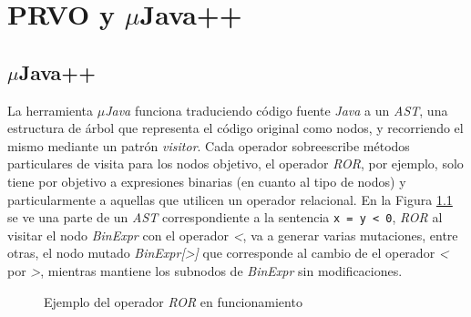 \chapter[Implementaci\'on]{PRVO y $\mu$Java++}
\label{cap:implementation}

\section{$\mu$Java++}

La herramienta \emph{$\mu$Java} \cite{bibliography.mutation.tools.muJavaMaOK05} funciona traduciendo c\'odigo fuente \emph{Java} a un \emph{AST}, una estructura de \'arbol que representa el c\'odigo original como nodos, y recorriendo el mismo mediante un patr\'on \emph{visitor}. Cada operador sobreescribe m\'etodos particulares de visita para los nodos objetivo, el operador \emph{ROR}, por ejemplo, solo tiene por objetivo a expresiones binarias (en cuanto al tipo de nodos) y particularmente a aquellas que utilicen un operador relacional. En la Figura \ref{figures.examples.rorMutation} se ve una parte de un \emph{AST} correspondiente a la sentencia \lstinline|x = y < 0|, \emph{ROR} al visitar el nodo \emph{BinExpr} con el operador \emph{<}, va a generar varias mutaciones, entre otras, el nodo mutado \emph{BinExpr[>]} que corresponde al cambio de el operador \emph{<} por \emph{>}, mientras mantiene los subnodos de \emph{BinExpr} sin modificaciones.

\begin{figure}
	\caption{Ejemplo del operador \emph{ROR} en funcionamiento}
	\label{figures.examples.rorMutation}
\end{figure}

